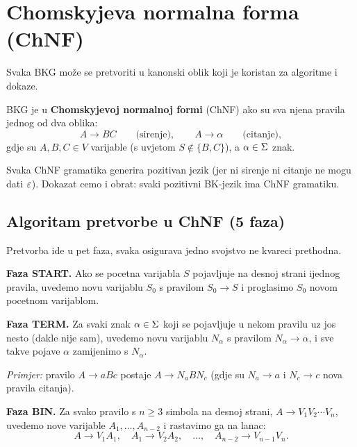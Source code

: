 \section{Chomskyjeva normalna forma (ChNF)}

Svaka BKG može se pretvoriti u kanonski oblik koji je koristan
za algoritme i dokaze.

\begin{definicija}
BKG je u \textbf{Chomskyjevoj normalnoj formi} (ChNF) ako su sva
njena pravila jednog od dva oblika:
\[
  A \to BC \qquad \text{(sirenje)}, \qquad A \to \alpha \qquad \text{(citanje)},
\]
gdje su $A, B, C \in V$ varijable (s uvjetom $S \notin \{B, C\}$),
a $\alpha \in \Sigma$ znak.
\end{definicija}

Svaka ChNF gramatika generira pozitivan jezik (jer ni sirenje ni
citanje ne mogu dati $\varepsilon$). Dokazat cemo i obrat: svaki pozitivni
BK-jezik ima ChNF gramatiku.

\subsection{Algoritam pretvorbe u ChNF (5 faza)}

Pretvorba ide u pet faza, svaka osigurava jedno svojstvo ne
kvareci prethodna.

\medskip
\noindent\textbf{Faza START.}
Ako se pocetna varijabla $S$ pojavljuje na desnoj strani ijednog
pravila, uvedemo novu varijablu $S_0$ s pravilom $S_0 \to S$ i
proglasimo $S_0$ novom pocetnom varijablom.

\medskip
\noindent\textbf{Faza TERM.}
Za svaki znak $\alpha \in \Sigma$ koji se pojavljuje u nekom pravilu
uz jos nesto (dakle nije sam), uvedemo novu varijablu $N_\alpha$
s pravilom $N_\alpha \to \alpha$, i sve takve pojave $\alpha$
zamijenimo s $N_\alpha$.

\emph{Primjer:} pravilo $A \to aBc$ postaje $A \to N_a B N_c$
(gdje su $N_a \to a$ i $N_c \to c$ nova pravila citanja).

\medskip
\noindent\textbf{Faza BIN.}
Za svako pravilo s $n \geq 3$ simbola na desnoj strani,
$A \to V_1 V_2 \cdots V_n$, uvedemo nove varijable $A_1, \ldots, A_{n-2}$
i rastavimo ga na lanac:
\[
  A \to V_1 A_1, \quad A_1 \to V_2 A_2, \quad \ldots, \quad A_{n-2} \to V_{n-1} V_n.
\]

